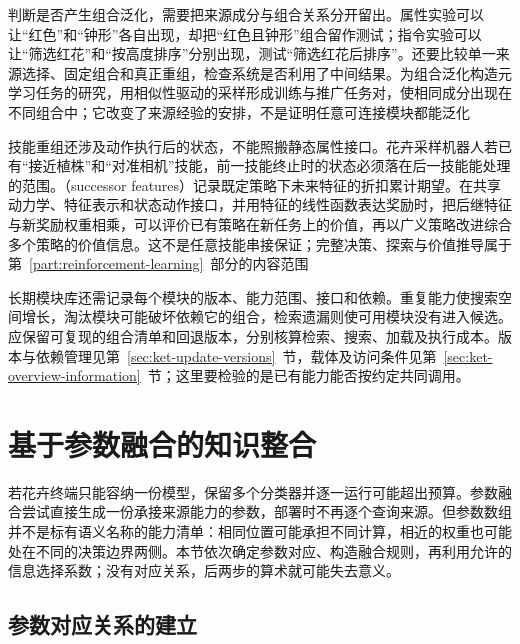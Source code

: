 判断是否产生组合泛化，需要把来源成分与组合关系分开留出。属性实验可以让“红色”和“钟形”各自出现，却把“红色且钟形”组合留作测试；指令实验可以让“筛选红花”和“按高度排序”分别出现，测试“筛选红花后排序”。还要比较单一来源选择、固定组合和真正重组，检查系统是否利用了中间结果。为组合泛化构造元学习任务的研究，用相似性驱动的采样形成训练与推广任务对，使相同成分出现在不同组合中；它改变了来源经验的安排，不是证明任意可连接模块都能泛化

技能重组还涉及动作执行后的状态，不能照搬静态属性接口。花卉采样机器人若已有“接近植株”和“对准相机”技能，前一技能终止时的状态必须落在后一技能能处理的范围。（successor features）记录既定策略下未来特征的折扣累计期望。在共享动力学、特征表示和状态动作接口，并用特征的线性函数表达奖励时，把后继特征与新奖励权重相乘，可以评价已有策略在新任务上的价值，再以广义策略改进综合多个策略的价值信息。这不是任意技能串接保证；完整决策、探索与价值推导属于第~\ref{part:reinforcement-learning}~部分的内容范围

长期模块库还需记录每个模块的版本、能力范围、接口和依赖。重复能力使搜索空间增长，淘汰模块可能破坏依赖它的组合，检索遗漏则使可用模块没有进入候选。应保留可复现的组合清单和回退版本，分别核算检索、搜索、加载及执行成本。版本与依赖管理见第~\ref{sec:ket-update-versions}~节，载体及访问条件见第~\ref{sec:ket-overview-information}~节；这里要检验的是已有能力能否按约定共同调用。

\section{基于参数融合的知识整合}
\label{sec:ket-integration-merging}

若花卉终端只能容纳一份模型，保留多个分类器并逐一运行可能超出预算。参数融合尝试直接生成一份承接来源能力的参数，部署时不再逐个查询来源。但参数数组并不是标有语义名称的能力清单：相同位置可能承担不同计算，相近的权重也可能处在不同的决策边界两侧。本节依次确定参数对应、构造融合规则，再利用允许的信息选择系数；没有对应关系，后两步的算术就可能失去意义。

\subsection{参数对应关系的建立}
\label{sec:ket-integration-alignment}

